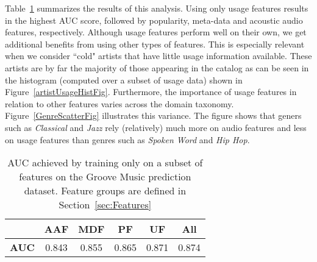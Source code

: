 Table~\ref{tab:features_AUC} summarizes the  results of this analysis. Using only usage features results in the highest AUC score, followed by popularity, meta-data and acoustic audio features, respectively. Although usage features perform well on their own, we get additional benefits from using other types of features. This is especially relevant when we consider ``cold" artists that have little usage information available. These artists are by far the majority of those appearing in the catalog as can be seen in the histogram (computed over a subset of usage data) shown in Figure~\ref{artistUsageHistFig}.  Furthermore, the importance of usage features in relation to other features varies across the domain taxonomy. Figure~\ref{GenreScatterFig} illustrates this variance. The figure shows that geners such as \textit{Classical} and \textit{Jazz} rely (relatively) much more on audio features and less on usage features than genres such as \textit{Spoken Word} and \textit{Hip Hop}.


\begin{table}[h!]
\begin{center}
	\begin{tabular}{|c|c|c|c|c|c|}
		\hline
		 & {\bf AAF} & {\bf MDF} & {\bf PF} & {\bf UF} & {\bf All}\\ 
		\hline
		 {\bf AUC} & 0.843  & 0.855 & 0.865 & 0.871 & 0.874\\ 
		\hline
	\end{tabular}
	\vspace{-0.4cm}
\end{center}
\caption{AUC achieved by training only on a subset of features on the Groove Music prediction dataset. Feature groups are defined in Section~\ref{sec:Features}}
\label{tab:features_AUC}
\end{table}











